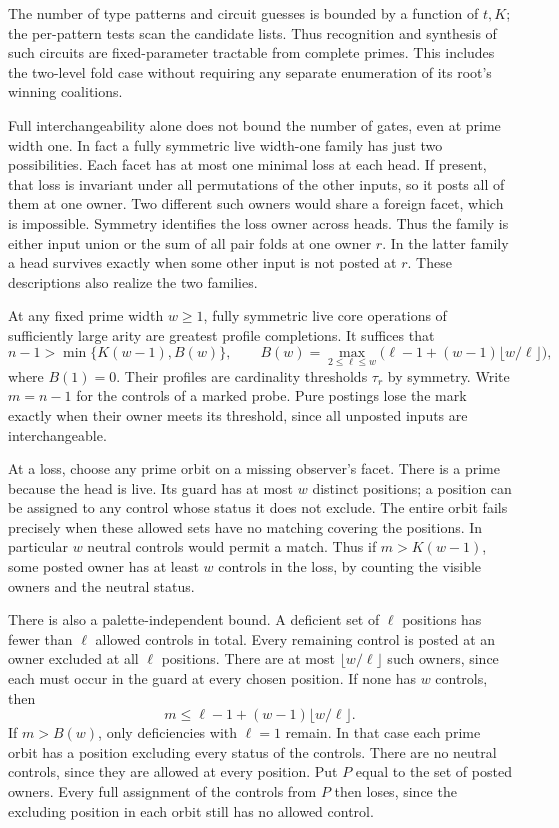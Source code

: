 The number of type patterns and circuit guesses is bounded
by a function of $t,K$; the per-pattern tests scan the
candidate lists. Thus recognition and synthesis of such
circuits are fixed-parameter tractable from complete primes.
This includes the two-level fold case without requiring
any separate enumeration of its root's winning coalitions.

Full interchangeability alone does not bound the number of
gates, even at prime width one. In fact a fully symmetric
live width-one family has just two possibilities. Each facet
has at most one minimal loss at each head. If present, that
loss is invariant under all permutations of the other inputs,
so it posts all of them at one owner. Two different such
owners would share a foreign facet, which is impossible.
Symmetry identifies the loss owner across heads. Thus the
family is either input union or the sum of all pair folds at
one owner $r$. In the latter family a head survives exactly
when some other input is not posted at $r$. These descriptions
also realize the two families.

At any fixed prime width $w\ge1$, fully symmetric live core
operations of sufficiently large arity are greatest profile
completions. It suffices that
\[
 n-1>\min\{K(w-1),B(w)\},\qquad
 B(w)=\max_{2\le\ell\le w}
       \bigl(\ell-1+(w-1)\lfloor w/\ell\rfloor\bigr),
\]
where $B(1)=0$.
Their profiles are cardinality thresholds $\tau_r$ by symmetry.
Write $m=n-1$ for the controls of a marked probe. Pure postings
lose the mark exactly when their owner meets its threshold,
since all unposted inputs are interchangeable.

At a loss, choose any prime orbit on a missing observer's
facet. There is a prime because the head is live. Its guard
has at most $w$ distinct positions; a position can be assigned
to any control whose status it does not exclude. The entire
orbit fails precisely when these allowed sets have no matching
covering the positions. In particular $w$ neutral controls
would permit a match. Thus if $m>K(w-1)$, some posted owner
has at least $w$ controls in the loss, by counting the visible
owners and the neutral status.

There is also a palette-independent bound. A deficient set
of $\ell$ positions has fewer than $\ell$ allowed controls
in total. Every remaining control is posted at an owner
excluded at all $\ell$ positions. There are at most
$\lfloor w/\ell\rfloor$ such owners, since each must occur
in the guard at every chosen position. If none has $w$
controls, then
\[
 m\le \ell-1+(w-1)\lfloor w/\ell\rfloor.
\]
If $m>B(w)$, only deficiencies with $\ell=1$ remain. In
that case each prime orbit has a position excluding every
status of the controls. There are no neutral controls, since
they are allowed at every position. Put $P$ equal to the set
of posted owners. Every full assignment of the controls from
$P$ then loses, since the excluding position in each orbit
still has no allowed control.

